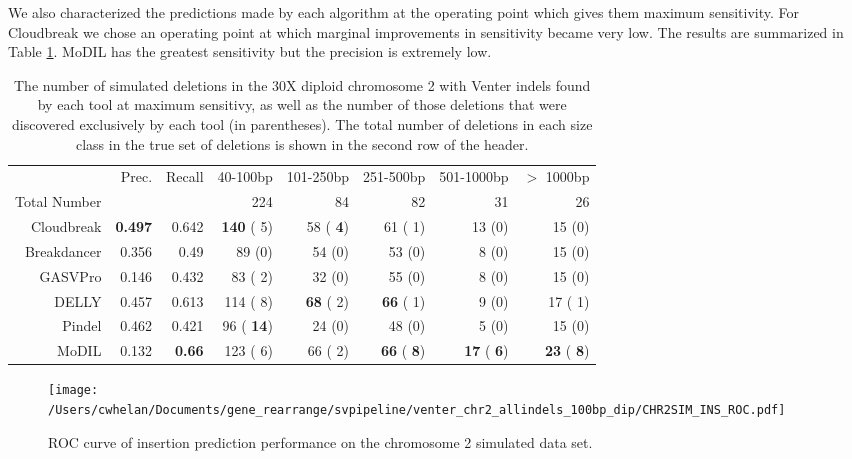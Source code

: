 \documentclass[11pt]{article}
\begin{document}
We also characterized the predictions made by each algorithm at the operating point which gives them maximum sensitivity. For Cloudbreak we chose an operating point at which marginal improvements in sensitivity became very low. The results are summarized in Table \ref{chr2DeletionPredsMaxSensitivity}. MoDIL has the greatest sensitivity but the precision is extremely low.

\begin{table}[b]
\begin{center}
\begin{tabular}{rrr|rrrrr}
  \hline
                        & Prec. & Recall & 40-100bp  & 101-250bp  & 251-500bp & 501-1000bp & $>$ 1000bp \\ 
 Total Number &          &           & 224 &  84 & 82 &  31 & 26\\ 
  \hline
  Cloudbreak    &  \textbf{0.497} & 0.642 & \textbf{ 140} (   5)  &   58 (\textbf{   4}) &    61 (   1) &   13 (0) &   15 (0) \\ 
  Breakdancer   &  0.356 & 0.49 &   89 (0)  &   54 (0) &    53 (0) &    8 (0) &   15 (0) \\ 
  GASVPro        & 0.146 & 0.432 &   83 (   2)  &   32 (0) &    55 (0) &    8 (0) &   15 (0) \\ 
  DELLY           & 0.457 & 0.613 &  114 (   8)  & \textbf{  68} (   2) &  \textbf{  66} (   1) &    9 (0) &   17 (   1) \\ 
  Pindel           & 0.462 & 0.421 &   96 (\textbf{  14})  &   24 (0) &    48 (0) &    5 (0) &   15 (0)\\ 
  MoDIL           & 0.132  & \textbf{0.66} &  123 (   6)  &   66 (   2) &  \textbf{  66} (\textbf{   8}) & \textbf{  17} (\textbf{   6}) & \textbf{  23} (\textbf{   8})\\ 
   \hline
\end{tabular}
\end{center}
\caption{The number of simulated deletions in the 30X diploid chromosome 2 with Venter indels found by each tool at maximum sensitivy, as well as the number of those deletions that were discovered exclusively by each tool (in parentheses). The total number of deletions in each size class in the true set of deletions is shown in the second row of the header.}
\label{chr2DeletionPredsMaxSensitivity}
\end{table}

\begin{figure}[t]
\centering
\texttt{[image: /Users/cwhelan/Documents/gene\_rearrange/svpipeline/venter\_chr2\_allindels\_100bp\_dip/CHR2SIM\_INS\_ROC.pdf]}
\caption{ROC curve of insertion prediction performance on the chromosome 2 simulated data set.}
\label{chr2InsertionsRoc}
\end{figure}
\end{document}

